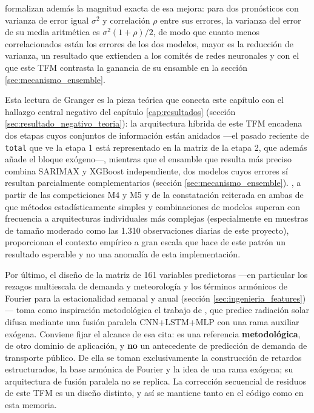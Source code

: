 \textcite{bates1969combination} formalizan además la magnitud exacta de esa mejora: para
dos pronósticos con varianza de error igual $\sigma^2$ y correlación $\rho$ entre sus
errores, la varianza del error de su media aritmética es $\sigma^2(1+\rho)/2$, de modo
que cuanto menos correlacionados están los errores de los dos modelos, mayor es la
reducción de varianza, un resultado que \textcite{perrone1993networks} extienden a los
comités de redes neuronales y con el que este TFM contrasta la ganancia de su ensamble en
la sección \ref{sec:mecanismo_ensemble}.

Esta lectura de Granger es la pieza teórica que conecta este capítulo con el hallazgo
central negativo del capítulo \ref{cap:resultados} (sección
\ref{sec:resultado_negativo_teoria}): la arquitectura híbrida de este TFM encadena dos
etapas cuyos conjuntos de información están anidados
—el pasado reciente de \texttt{total} que ve la etapa 1 está representado en la matriz
de la etapa 2, que además añade el bloque exógeno—, mientras que el ensamble que resulta
más preciso combina SARIMAX y XGBoost independiente, dos modelos cuyos errores sí
resultan parcialmente complementarios (sección \ref{sec:mecanismo_ensemble}).
\textcite{makridakis2018m4,makridakis2022m5}, a partir de las competiciones M4 y M5 y de
la constatación reiterada en ambas de que métodos estadísticamente simples y
combinaciones de modelos superan con frecuencia a arquitecturas individuales más
complejas (especialmente en muestras de tamaño moderado como las 1.310 observaciones
diarias de este proyecto), proporcionan el contexto empírico a gran escala que hace de
este patrón un resultado esperable y no una anomalía de esta implementación.

\begin{sloppypar}
Por último, el diseño de la matriz de 161 variables predictoras —en particular los
rezagos multiescala de demanda y meteorología y los términos armónicos de Fourier para la
estacionalidad semanal y anual (sección \ref{sec:ingenieria_features})— toma como
inspiración metodológica el trabajo de \textcite{surribas_sayago_diffuse}, que predice
radiación solar difusa mediante una fusión paralela CNN+LSTM+MLP con una rama auxiliar
exógena. Conviene fijar el alcance de esa cita: es una referencia
\textbf{metodológica}, de otro dominio de aplicación, y \textbf{no} un antecedente de
predicción de demanda de transporte público. De ella se toman exclusivamente la
construcción de retardos estructurados, la base armónica de Fourier y la idea de una rama
exógena; su arquitectura de fusión paralela no se replica. La corrección secuencial de
residuos de este TFM es un diseño distinto, y así se mantiene tanto en el código como en
esta memoria.
\end{sloppypar}

